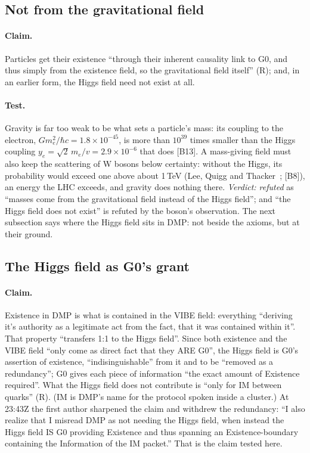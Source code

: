 \documentclass[11pt,a4paper]{article}
\theoremstyle{definition}
\newcommand{\chk}[1]{\textsf{[#1]}}
\newcommand{\tagR}{\textsf{(R)}}
\begin{document}
\subsection{Not from the gravitational field}

\paragraph{Claim.} Particles get their existence ``through their inherent causality link to G0, and thus simply from the existence field,
so the gravitational field itself'' \tagR; and, in an earlier form, the Higgs field need not exist at all.

\paragraph{Test.} Gravity is far too weak to be what sets a particle's mass: its coupling to the electron, $Gm_e^2/\hbar c=1.8\times10^{-45}$,
is more than $10^{39}$ times smaller than the Higgs coupling $y_e=\sqrt2\,m_e/v=2.9\times10^{-6}$ that does \chk{B13}. A mass-giving field
must also keep the scattering of W bosons below certainty: without the Higgs, its probability would exceed one above about 1\,TeV (Lee,
Quigg and Thacker~\cite{lqt}; \chk{B8}), an energy the LHC exceeds, and gravity does nothing there. \emph{Verdict: refuted} as ``masses come
from the gravitational field instead of the Higgs field''; and ``the Higgs field does not exist'' is refuted by the boson's observation.
The next subsection says where the Higgs field sits in DMP: not beside the axioms, but at their ground.

\subsection{The Higgs field as G0's grant}\label{sec:higgsgrant}

\paragraph{Claim.} Existence in DMP is what is contained in the VIBE field: everything ``deriving it's authority as a legitimate act from
the fact, that it was contained within it''. That property ``transfers 1:1 to the Higgs field''. Since both existence and the VIBE field
``only come as direct fact that they ARE G0'', the Higgs field is G0's assertion of existence, ``indisinguishable'' from it and to be
``removed as a redundancy''; G0 gives each piece of information ``the exact amount of Existence required''. What the Higgs field does not
contribute is ``only for IM between quarks'' \tagR. (IM is DMP's name for the protocol spoken inside a cluster.) At 23:43Z the first author
sharpened the claim and withdrew the redundancy: ``I also realize that I misread DMP as not needing the Higgs field, when instead the
Higgs field IS G0 providing Existence and thus spanning an Existence-boundary containing the Information of the IM packet.'' That is the
claim tested here.
\end{document}
